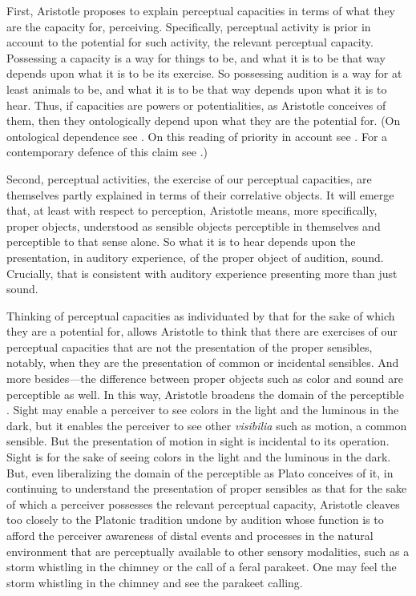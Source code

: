 First, Aristotle proposes to explain perceptual capacities in terms of what they are the capacity for, perceiving.  Specifically, perceptual activity is prior in account to the potential for such activity, the relevant perceptual capacity. Possessing a capacity is a way for things to be, and what it is to be that way depends upon what it is to be its exercise. So possessing audition is a way for at least animals to be, and what it is to be that way depends upon what it is to hear. Thus, if capacities are powers or potentialities, as Aristotle conceives of them, then they ontologically depend upon what they are the potential for. (On ontological dependence see \citealt{Fine:1995ls}. On this reading of priority in account see \citealt{Peramatzis:2011aa}. For a contemporary defence of this claim see \citealt{Kalderon:2012fk}.) 

Second, perceptual activities, the exercise of our perceptual capacities, are themselves partly explained in terms of their correlative objects. It will emerge that, at least with respect to perception, Aristotle means, more specifically, proper objects, understood as sensible objects perceptible in themselves and perceptible to that sense alone. So what it is to hear depends upon the presentation, in auditory experience, of the proper object of audition, sound. Crucially, that is consistent with auditory experience presenting more than just sound.

Thinking of perceptual capacities as individuated by that for the sake of which they are a potential for, allows Aristotle to think that there are exercises of our perceptual capacities that are not the presentation of the proper sensibles, notably, when they are the presentation of common or incidental sensibles. And more besides---the difference between proper objects such as color and sound are perceptible as well. In this way, Aristotle broadens the domain of the perceptible \citep{Sorabji:1971fr,Sorabji:2003fk}. Sight may enable a perceiver to see colors in the light and the luminous in the dark, but it enables the perceiver to see other \emph{visibilia} such as motion, a common sensible. But the presentation of motion in sight is incidental to its operation. Sight is for the sake of seeing colors in the light and the luminous in the dark. But, even liberalizing the domain of the perceptible as Plato conceives of it, in continuing to understand the presentation of proper sensibles as that for the sake of which a perceiver possesses the relevant perceptual capacity, Aristotle cleaves too closely to the Platonic tradition undone by audition whose function is to afford the perceiver awareness of distal events and processes in the natural environment that are perceptually available to other sensory modalities, such as a storm whistling in the chimney or the call of a feral parakeet. One may feel the storm whistling in the chimney and see the parakeet calling.

